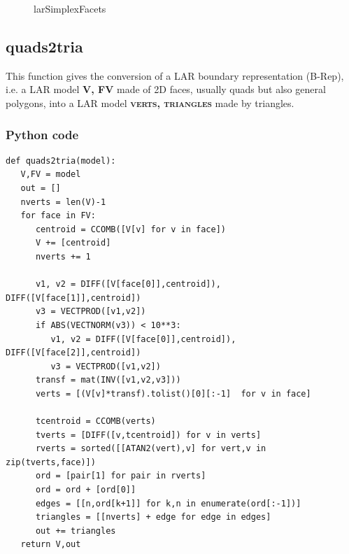 \documentclass[a4paper,12pt,titlepage]{article}					%
\begin{document}
\begin{figure}[h]
\caption{larSimplexFacets}
\label{fig:larSimplexFacets}
\end{figure}


\subsection{quads2tria}
This function gives the conversion of a LAR boundary representation (B-Rep), i.e. a LAR model \textbf{\textsc{V, FV}} made of 2D faces, usually quads but also general polygons, into a LAR model \textbf{\textsc{verts, triangles}} made by triangles.

\subsubsection{Python code}
\begin{verbatim}
def quads2tria(model):
   V,FV = model
   out = []
   nverts = len(V)-1
   for face in FV:
      centroid = CCOMB([V[v] for v in face])
      V += [centroid]
      nverts += 1
      
      v1, v2 = DIFF([V[face[0]],centroid]), DIFF([V[face[1]],centroid])
      v3 = VECTPROD([v1,v2])
      if ABS(VECTNORM(v3)) < 10**3:
         v1, v2 = DIFF([V[face[0]],centroid]), DIFF([V[face[2]],centroid])
         v3 = VECTPROD([v1,v2])
      transf = mat(INV([v1,v2,v3]))
      verts = [(V[v]*transf).tolist()[0][:-1]  for v in face]

      tcentroid = CCOMB(verts)
      tverts = [DIFF([v,tcentroid]) for v in verts]
      rverts = sorted([[ATAN2(vert),v] for vert,v in zip(tverts,face)])
      ord = [pair[1] for pair in rverts]
      ord = ord + [ord[0]]
      edges = [[n,ord[k+1]] for k,n in enumerate(ord[:-1])]
      triangles = [[nverts] + edge for edge in edges]
      out += triangles
   return V,out
\end{verbatim}
\end{document}
